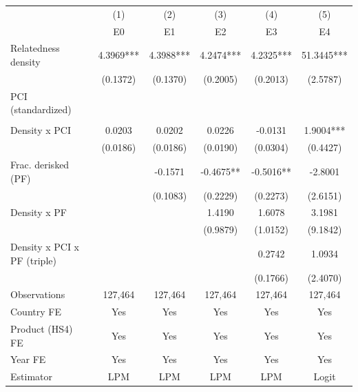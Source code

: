 \begin{tabular}{lccccc}
\toprule
 & (1) & (2) & (3) & (4) & (5) \\
 & E0 & E1 & E2 & E3 & E4 \\
\midrule
Relatedness density & 4.3969*** & 4.3988*** & 4.2474*** & 4.2325*** & 51.3445*** \\
 & (0.1372) & (0.1370) & (0.2005) & (0.2013) & (2.5787) \\
PCI (standardized) &  &  &  &  &  \\
 &  &  &  &  &  \\
Density x PCI & 0.0203 & 0.0202 & 0.0226 & -0.0131 & 1.9004*** \\
 & (0.0186) & (0.0186) & (0.0190) & (0.0304) & (0.4427) \\
Frac. derisked (PF) &  & -0.1571 & -0.4675** & -0.5016** & -2.8001 \\
 &  & (0.1083) & (0.2229) & (0.2273) & (2.6151) \\
Density x PF &  &  & 1.4190 & 1.6078 & 3.1981 \\
 &  &  & (0.9879) & (1.0152) & (9.1842) \\
Density x PCI x PF (triple) &  &  &  & 0.2742 & 1.0934 \\
 &  &  &  & (0.1766) & (2.4070) \\
\midrule
Observations & 127,464 & 127,464 & 127,464 & 127,464 & 127,464 \\
Country FE & Yes & Yes & Yes & Yes & Yes \\
Product (HS4) FE & Yes & Yes & Yes & Yes & Yes \\
Year FE & Yes & Yes & Yes & Yes & Yes \\
Estimator & LPM & LPM & LPM & LPM & Logit \\
\bottomrule
\end{tabular}